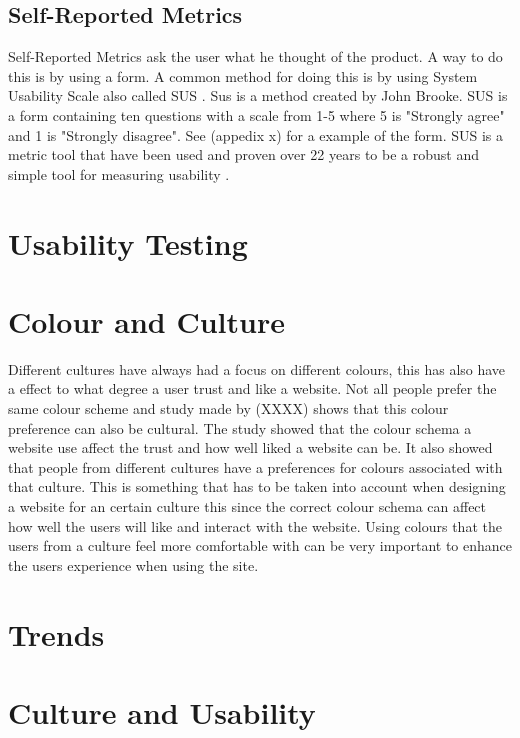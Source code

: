 \subsection{Self-Reported Metrics}
Self-Reported Metrics ask the user what he thought of the product. A way to do this is by using a form. A common method for doing this is by using System Usability Scale also called SUS \cite{tullis_albert_2011} \cite{brooke1996sus}. Sus is a method created by John Brooke. SUS is a form containing ten questions with a scale from 1-5 where 5 is "Strongly agree" and 1 is "Strongly disagree". See (appedix x) for a example of the form. SUS is a metric tool that have been used and proven over 22 years to be a robust and simple tool for measuring usability \cite{brooke1996sus}.  
\section{Usability Testing}
\section{Colour and Culture}
Different cultures have always had a focus on different colours, this has also have a effect to what degree a user trust and like a website. Not all people prefer the same colour scheme and study made by (XXXX) \cite{Color} shows that this colour preference can also be cultural. The study showed that the colour schema a website use affect the trust and how well liked a website can be. It also showed that people from different cultures have a preferences for colours associated with that culture. This is something that has to be taken into account when designing a website for an certain culture this since the correct colour schema can affect how well the users will like and interact with the website. Using colours that the users from a culture feel more comfortable with can be very important to enhance the users experience when using the site.
\section{Trends}
\section{Culture and Usability}

